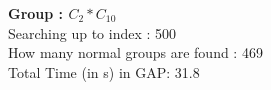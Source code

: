 \textbf{Group : $C_2*C_{10}$}\\
Searching up to index : 500\\
How many normal groups are found : 469\\
Total Time (in s) in GAP: 31.8\\
